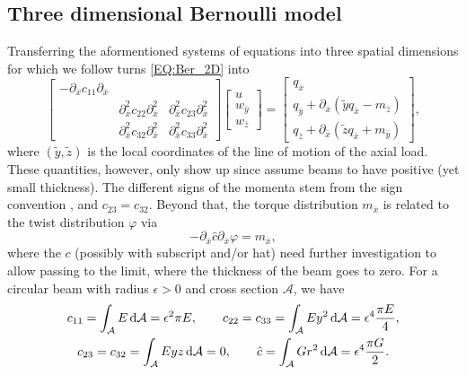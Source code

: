 \documentclass[a4paper, english, 12pt, reqno, draft]{amsart}
\theoremstyle{definition}
\theoremstyle{remark}
\numberwithin{equation}{section}
\newcommand{\longDef}{\ensuremath{u}}
\newcommand{\crossDef}{\ensuremath{w}}
\newcommand{\torsion}{\ensuremath{\varphi}}
\newcommand{\force}{\ensuremath{q}}
\newcommand{\momentum}{\ensuremath{m}}
\newcommand{\crossSect}{\ensuremath{\mathcal A}}
\begin{document}
\subsection{Three dimensional Bernoulli model}\label{SEC:3d_Ber}
% 
Transferring the aformentioned systems of equations into three spatial dimensions for which we follow \cite[Sect.\ 6.1--6.4]{BauchauC2009} turns \eqref{EQ:Ber_2D} into
% 
\begin{equation}\label{EQ:Ber_3D}
 \begin{bmatrix}
  -\partial_{\bar x} c_{11} \partial_{\bar x} & & \\
  & \partial^2_{\bar x} c_{22} \partial^2_{\bar x} & \partial^2_{\bar x} c_{23} \partial^2_{\bar x} \\
  & \partial^2_{\bar x} c_{32} \partial^2_{\bar x} & \partial^2_{\bar x} c_{33} \partial^2_{\bar x}
 \end{bmatrix}
 \begin{bmatrix}
  \longDef \\ \crossDef_{\bar y} \\ \crossDef_{\bar z}
 \end{bmatrix}
 =
 \begin{bmatrix}
  \force_{\bar x} \\ \force_{\bar y} + \partial_{\bar x} ( \tilde y \force_{\bar x} - \momentum_{\bar z} ) \\ \force_{\bar z} + \partial_{\bar x} ( \tilde z \force_{\bar x} + \momentum_{\bar y} )
 \end{bmatrix},
\end{equation}
% 
where $(\tilde y, \tilde z)$ is the local coordinates of the line of motion of the axial load. These quantities, however, only show up since \cite[Sect.\ 5--8]{BauchauC2009} assume beams to have positive (yet small thickness). The different signs of the momenta stem from the sign convention \cite[Sect.\ 5.2]{BauchauC2009}, and $c_{23} = c_{32}$. Beyond that, the torque distribution $\momentum_{\bar x}$ is related to the twist distribution $\torsion$ via
% 
\begin{equation}
 -\partial_{\bar x} \hat c \partial_{\bar x} \torsion = \momentum_{\bar x},
\end{equation}
% 
where the $c$ (possibly with subscript and/or hat) need further investigation to allow passing to the limit, where the thickness of the beam goes to zero. For a circular beam with radius $\epsilon > 0$ and cross section $\crossSect$, we have
% 
\begin{gather*}
 c_{11} = \int_\crossSect E \, \textup d\crossSect = \epsilon^2 \pi E, \qquad c_{22} = c_{33} = \int_\crossSect E y^2 \, \textup d\crossSect = \epsilon^4 \frac{\pi E}{4}, \\
 c_{23} = c_{32} = \int_\crossSect E y z \, \textup d\crossSect = 0, \qquad \hat c = \int_\crossSect G r^2 \, \textup d \crossSect = \epsilon^4 \frac{\pi G}{2}.
\end{gather*}
\end{document}
